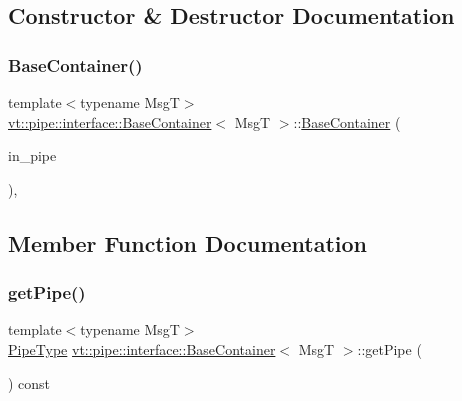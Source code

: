 \subsection{Constructor \& Destructor Documentation}
\mbox{\label{structvt_1_1pipe_1_1interface_1_1_base_container_a096a87229f8c5b3b3bd0cca47cc7f45a}} 
\subsubsection{\texorpdfstring{Base\+Container()}{BaseContainer()}}
{\footnotesize\ttfamily template$<$typename MsgT$>$ \\
\hyperlink{structvt_1_1pipe_1_1interface_1_1_base_container}{vt\+::pipe\+::interface\+::\+Base\+Container}$<$ MsgT $>$\+::\hyperlink{structvt_1_1pipe_1_1interface_1_1_base_container}{Base\+Container} (\begin{DoxyParamCaption}\item[{\hyperlink{namespacevt_ac9852acda74d1896f48f406cd72c7bd3}{Pipe\+Type} const \&}]{in\+\_\+pipe }\end{DoxyParamCaption})\hspace{0.3cm}{\ttfamily [inline]}, {\ttfamily [explicit]}}



\subsection{Member Function Documentation}
\mbox{\label{structvt_1_1pipe_1_1interface_1_1_base_container_a5301aebfd709a96a3de5e03218c9300f}} 
\subsubsection{\texorpdfstring{get\+Pipe()}{getPipe()}}
{\footnotesize\ttfamily template$<$typename MsgT$>$ \\
\hyperlink{namespacevt_ac9852acda74d1896f48f406cd72c7bd3}{Pipe\+Type} \hyperlink{structvt_1_1pipe_1_1interface_1_1_base_container}{vt\+::pipe\+::interface\+::\+Base\+Container}$<$ MsgT $>$\+::get\+Pipe (\begin{DoxyParamCaption}{ }\end{DoxyParamCaption}) const\hspace{0.3cm}{\ttfamily [inline]}}


